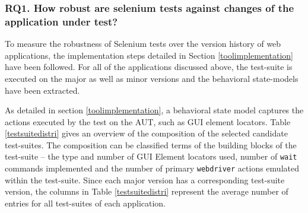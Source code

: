 \subsubsection*{{\bfseries RQ1.} How robust are selenium tests against changes of the application under test?}
To measure the robustness of Selenium tests over the version history of web applications, the implementation steps detailed in Section \ref{toolimplementation} have been followed. 
For all of the applications discussed above, the
test-suite is executed on the major as well as minor versions and the behavioral state-models have been extracted. 

As detailed in section \ref{toolimplementation}, a behavioral state model captures the actions executed by the test on the AUT, such as GUI element locators. Table \ref{testsuitedistri} gives an overview of the composition of the selected candidate test-suites. The composition can be classified terms of the building blocks of the test-suite -- the type and number of GUI Element locators used, number of \texttt{wait} commands implemented and the number of primary \texttt{webdriver} actions emulated within the test-suite. Since each major version has a corresponding test-suite version, the columns in Table \ref{testsuitedistri} represent the average number of entries for all test-suites of each application.  


